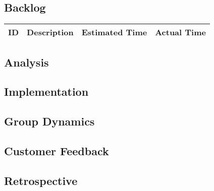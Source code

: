 \subsection{Backlog}
\begin{tabular}{|l|p{6cm}|p{2cm}|p{2cm}|}
\hline
ID & Description & Estimated Time & Actual Time \\
\hline

\end{tabular}

\subsection{Analysis}

\subsection{Implementation}

\subsection{Group Dynamics}

\subsection{Customer Feedback}

\subsection{Retrospective}